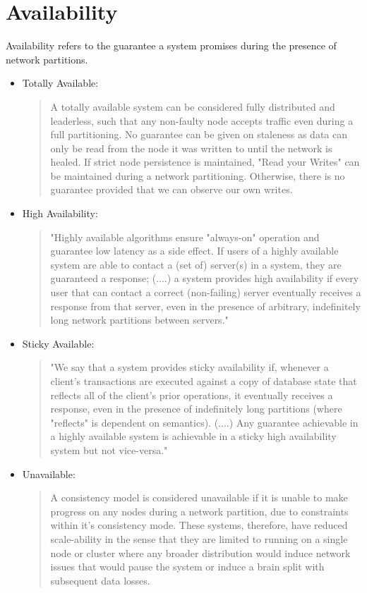 \documentclass[a4paper,10pt,titlepage]{report}
\begin{document}
\section{Availability}

Availability refers to the guarantee a system promises during the presence of network partitions.\cite{HighlyAvailableTransactionsVirtuesandLimitations}

\begin{itemize}
   \item Totally Available: 
   \begin{quote}
       A totally available system can be considered fully distributed and leaderless, such that any non-faulty node accepts traffic even during a full partitioning. No guarantee can be given on staleness as data can only be read from the node it was written to until the network is healed. If strict node persistence is maintained, "Read your Writes" can be maintained during a network partitioning. Otherwise, there is no guarantee provided that we can observe our own writes. 
   \end{quote}
   
    \item High Availability:
    \begin{quote}
        "Highly available algorithms ensure "always-on" operation and guarantee low latency as a side effect. If users of a highly available system are able to contact a (set of) server(s) in a system, they are guaranteed a response; (....) a system provides high availability if every user that can contact a correct (non-failing) server eventually receives a response from that server, even in the presence of arbitrary, indefinitely long network partitions between servers." \cite{CAP, HighlyAvailableTransactionsVirtuesandLimitations}
    \end{quote} 
    \item Sticky Available: 
    \begin{quote}
    "We say that a system provides sticky availability if, whenever a client's transactions are executed against a copy of database state that reflects all of the client's prior operations, it eventually receives a response, even in the presence of indefinitely long partitions (where "reflects" is dependent on semantics). (....) Any guarantee achievable in a highly available system is achievable in a sticky high availability system but not vice-versa."\cite{HighlyAvailableTransactionsVirtuesandLimitations}
    \end{quote} 
    \item Unavailable: 
    \begin{quote}
    A consistency model is considered unavailable if it is unable to make progress on any nodes during a network partition, due to constraints within it's consistency mode. These systems, therefore, have reduced scale-ability in the sense that they are limited to running on a single node or cluster where any broader distribution would induce network issues that would pause the system or induce a brain split with subsequent data losses.
\end{quote}
 
\end{itemize}
\end{document}
